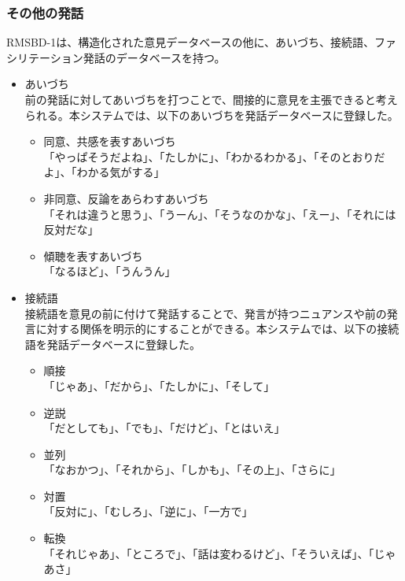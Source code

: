 \documentclass[11pt, a4paper]{jreport} %
\begin{document}
\subsubsection*{その他の発話}
RMSBD-1は、構造化された意見データベースの他に、あいづち、接続語、ファシリテーション発話のデータベースを持つ。

\begin{itemize}
\item あいづち\\
前の発話に対してあいづちを打つことで、間接的に意見を主張できると考えられる。本システムでは、以下のあいづちを発話データベースに登録した。
\begin{itemize}
\item 同意、共感を表すあいづち\\
「やっぱそうだよね」、「たしかに」、「わかるわかる」、「そのとおりだよ」、「わかる気がする」
\item 非同意、反論をあらわすあいづち\\
「それは違うと思う」、「うーん」、「そうなのかな」、「えー」、「それには反対だな」
\item 傾聴を表すあいづち\\
「なるほど」、「うんうん」

\end{itemize}

\item 接続語\\
接続語を意見の前に付けて発話することで、発言が持つニュアンスや前の発言に対する関係を明示的にすることができる。本システムでは、以下の接続語を発話データベースに登録した。
\begin{itemize}
\item 順接\\
「じゃあ」、「だから」、「たしかに」、「そして」
\item 逆説\\
「だとしても」、「でも」、「だけど」、「とはいえ」
\item 並列\\
「なおかつ」、「それから」、「しかも」、「その上」、「さらに」
\item 対置\\
「反対に」、「むしろ」、「逆に」、「一方で」
\item 転換\\
「それじゃあ」、「ところで」、「話は変わるけど」、「そういえば」、「じゃあさ」
\end{itemize}


\end{itemize}
\end{document}
